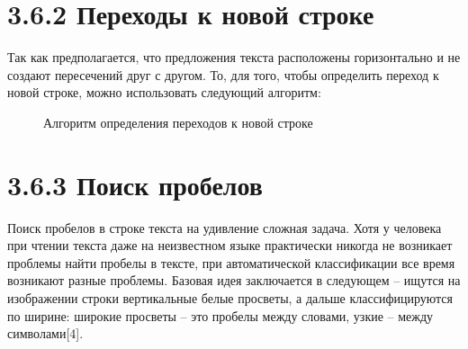 \documentclass[14pt,a4paper]{extreport}
\begin{document}
            \section*{\normalsize\hspace{4ex}3.6.2 Переходы к новой строке}
            
\hspace {4ex} Так как предполагается, что предложения текста расположены горизонтально и не создают пересечений друг с другом. То, для того, чтобы определить переход к новой строке, можно использовать следующий алгоритм:\
            
\begin{figure}[h!]
\caption{Алгоритм определения переходов к новой строке}
\end{figure} 

            \section*{\normalsize\hspace{4ex}3.6.3 Поиск пробелов}

\hspace {4ex} Поиск пробелов в строке текста на удивление сложная задача. Хотя у человека при чтении текста даже на неизвестном языке практически никогда не возникает проблемы найти пробелы в тексте, при автоматической классификации все время возникают разные проблемы.
\hspace {4ex} Базовая идея заключается в следующем – ищутся на изображении строки вертикальные белые просветы, а дальше классифицируются по ширине: широкие просветы – это пробелы между словами, узкие – между символами[4].
            
\end{document}

